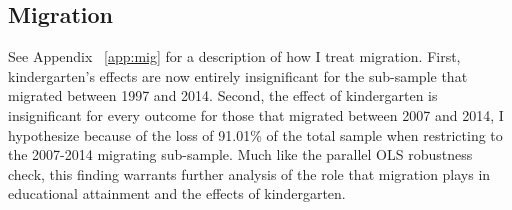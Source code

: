 	\subsection{Migration}
See Appendix ~\ref{app:mig} for a description of how I treat migration. First, kindergarten's effects are now entirely insignificant for the sub-sample that migrated between 1997 and 2014. Second, the effect of kindergarten is insignificant for every outcome for those that migrated between 2007 and 2014, I hypothesize because of the loss of 91.01\% of the total sample when restricting to the 2007-2014 migrating sub-sample. Much like the parallel OLS robustness check, this finding warrants further analysis of the role that migration plays in educational attainment and the effects of kindergarten.




